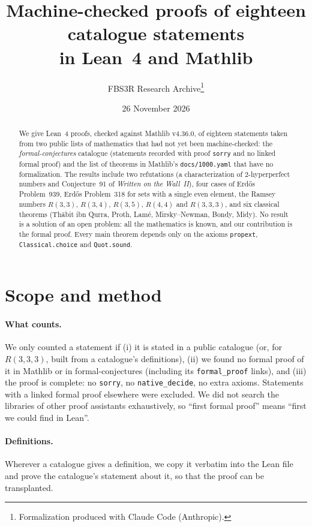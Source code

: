 \documentclass[11pt,a4paper]{article}
\title{Machine-checked proofs of eighteen catalogue statements\\
  in Lean~4 and Mathlib}
\author{FBS3R Research Archive\thanks{Formalization produced with Claude Code (Anthropic).}}
\date{26 November 2026}
\newcommand{\lean}[1]{\texttt{#1}}
\begin{document}
\maketitle

\begin{abstract}
We give Lean~4 proofs, checked against Mathlib v4.36.0, of eighteen statements taken from two
public lists of mathematics that had not yet been machine-checked: the \emph{formal-conjectures}
catalogue (statements recorded with proof \lean{sorry} and no linked formal proof) and the list of
theorems in Mathlib's \lean{docs/1000.yaml} that have no formalization. The results include two
refutations (a characterization of $2$-hyperperfect numbers and Conjecture~91 of
\emph{Written on the Wall~II}), four cases of Erd\H{o}s Problem~939, Erd\H{o}s Problem~318 for
sets with a single even element, the Ramsey numbers $R(3,3)$, $R(3,4)$, $R(3,5)$, $R(4,4)$ and
$R(3,3,3)$, and six classical theorems (Th\=abit ibn Qurra, Proth, Lam\'e, Mirsky--Newman, Bondy,
Midy). No result is a solution of an open problem: all the mathematics is known, and our
contribution is the formal proof. Every main theorem depends only on the axioms
\lean{propext}, \lean{Classical.choice} and \lean{Quot.sound}.
\end{abstract}

\section{Scope and method}

\paragraph{What counts.} We only counted a statement if (i) it is stated in a public catalogue
(or, for $R(3,3,3)$, built from a catalogue's definitions), (ii) we found no formal proof of it in
Mathlib or in formal-conjectures (including its \lean{formal\_proof} links), and (iii) the proof is
complete: no \lean{sorry}, no \lean{native\_decide}, no extra axioms. Statements with a linked
formal proof elsewhere were excluded. We did not search the libraries of other proof assistants
exhaustively, so ``first formal proof'' means ``first we could find in Lean''.

\paragraph{Definitions.} Wherever a catalogue gives a definition, we copy it verbatim into the
Lean file and prove the catalogue's statement about it, so that the proof can be transplanted.
\end{document}
